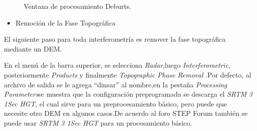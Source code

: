 \documentclass{article}
\begin{document}
\begin{figure}[htbp]
\begin{minipage}[b]{0.5\linewidth}
\caption{Ventana de procesamiento Deburts.}
\label{fig:figura9}
\end{minipage}
\end{figure}
\begin{itemize}
    \item Remoción de la Fase Topográfica
\end{itemize}    
     El siguiente paso para toda interferometría es
remover la fase topográfica mediante un DEM.

En el menú de la barra superior, se selecciona
\textit{Radar},luego \textit{Interferometric}, posteriormente \textit{Products} y finalmente \textit{Topographic Phase Removal} .Por defecto, al archivo de salida se le
agrega “dinsar” al nombre,en la pestaña \textit{Processing Parameters}se muestra que la configuración
preprogramada se descarga el \textit{SRTM 3 1Sec HGT}, el cual sirve para un preprocesamiento básico, pero puede
que necesite otro DEM en algunos casos.De acuerdo al foro STEP Forum también se puede usar \textit{SRTM 3 1Sec HGT} para un procesamiento básico.\\ \\ \\ \\ \\ \\ \\ \\ \\ \\ \\ \\ \\ \\ \\ \\ \\ \\ \\ \\ \\ \\ \\ \\ \\ \\ \\ \\ \\ \\ \\ \\ \\
\end{document}
